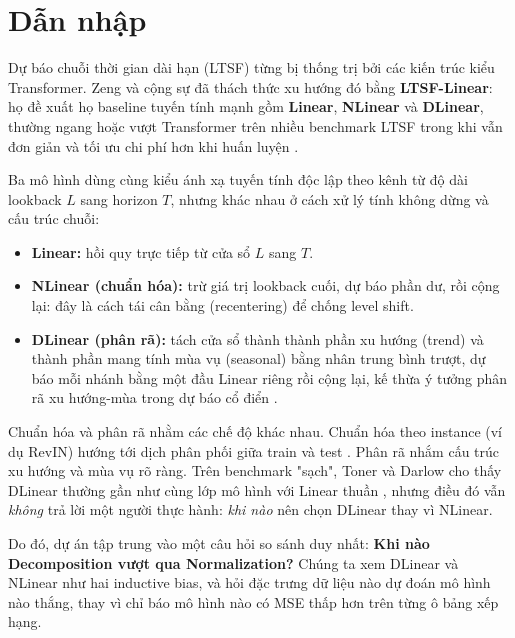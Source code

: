 \section{Dẫn nhập}
\label{sec:introduction}

Dự báo chuỗi thời gian dài hạn (LTSF) từng bị thống trị bởi các kiến trúc kiểu Transformer.
Zeng và cộng sự đã thách thức xu hướng đó bằng \textbf{LTSF-Linear}: họ đề xuất họ baseline
tuyến tính mạnh gồm \textbf{Linear}, \textbf{NLinear} và \textbf{DLinear}, thường ngang
hoặc vượt Transformer trên nhiều benchmark LTSF trong khi vẫn đơn giản và tối ưu chi phí hơn khi huấn luyện
\cite{zeng2023ltsf}.

Ba mô hình dùng cùng kiểu ánh xạ tuyến tính độc lập theo kênh từ độ dài lookback \(L\) sang
horizon \(T\), nhưng khác nhau ở cách xử lý tính không dừng và cấu trúc chuỗi:

\begin{itemize}
      \item \textbf{Linear:} hồi quy trực tiếp từ cửa sổ \(L\) sang \(T\).
      \item \textbf{NLinear (chuẩn hóa):} trừ giá trị lookback cuối, dự báo phần dư, rồi cộng lại:
            đây là cách tái cân bằng (recentering) để chống level shift.
      \item \textbf{DLinear (phân rã):} tách cửa sổ thành thành phần xu hướng (trend) và thành phần mang
            tính mùa vụ (seasonal) bằng nhân trung bình trượt, dự báo mỗi nhánh bằng một đầu Linear riêng rồi
            cộng lại, kế thừa ý tưởng phân rã xu hướng-mùa trong dự báo cổ điển
            \cite{cleveland1990stl,wu2021autoformer,zhou2022fedformer}.
\end{itemize}

Chuẩn hóa và phân rã nhằm các chế độ khác nhau. Chuẩn hóa theo instance (ví dụ RevIN)
hướng tới dịch phân phối giữa train và test \cite{kim2022revin}. Phân rã nhắm cấu trúc xu hướng
và mùa vụ rõ ràng. Trên benchmark "sạch", Toner và Darlow cho thấy DLinear thường gần như
cùng lớp mô hình với Linear thuần \cite{toner2024linear}, nhưng điều đó vẫn \emph{không} trả lời
một người thực hành: \emph{khi nào} nên chọn DLinear thay vì NLinear.

Do đó, dự án tập trung vào một câu hỏi so sánh duy nhất:
\textbf{Khi nào Decomposition vượt qua Normalization?}
Chúng ta xem DLinear và NLinear như hai inductive bias, và hỏi đặc trưng dữ liệu nào dự đoán
mô hình nào thắng, thay vì chỉ báo mô hình nào có MSE thấp hơn trên từng ô bảng xếp hạng.
